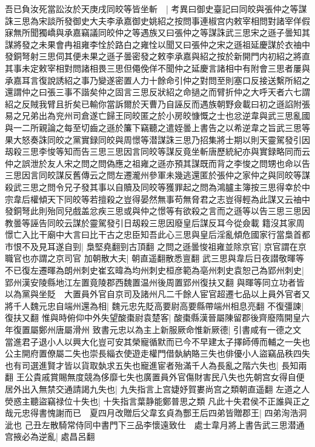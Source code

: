 吾已負汝死當訟汝於天庚戌同皎等皆坐斬　|{
	考異曰御史臺記曰同皎與張仲之等謀誅三思為宋談所發御史大夫李承嘉御史姚紹之按問事連椒宫内敕宰相問對諸宰佯假寐無所聞獨嶠與承嘉竊議同皎仲之等遇族又曰張仲之等謀誅武三思宋之遜子曇知其謀將發之未果會冉祖雍李恮於路白之雍恮以聞又曰張仲之宋之遜祖延慶謀於衣䄂中發銅弩射三思伺其便未果之遜子曇密發之敕李承嘉與紹之按於新開門内初紹之將直其事未定敕宰相對問諸相畏三思但僶俛佯不聞仲之延慶言諸相中有附會三思者屢與承嘉耳言復說誘紹之事乃變遂密置人力十餘命引仲之對問至則塞口反接送繫所紹之還謂仲之曰張三事不諧矣仲之固言三思反狀紹之命撾之而臂折仲之大呼天者六七謂紹之反賊我臂且折矣已輸你當訴爾於天曹乃自誣反而遇族朝野僉載曰初之遜諂附張易之兄弟出為兖州司倉遂亡歸王同皎匿之於小房皎慷慨之士也忿逆韋與武三思亂國與一二所親論之每至切齒之遜於簾下竊聽之遣姪曇上書告之以希逆韋之旨武三思等果大怒奏誅同皎之黨實録同皎與周憬等潜謀誅三思乃招集將士期以則天靈駕發引因刼殺三思李悛等知而告三思三思因言同皎等謀反竟坐斬唐歷統紀亦與實録略同而云仲之誤泄於友人宋之問之問偽應之祖雍之遜亦預其謀既而背之李悛之問甥也命以告三思因言同皎謀反舊傳云之問左遷瀧州參軍未幾逃還匿於張仲之家仲之與同皎等謀殺武三思之問令兄子發其事以自贖及同皎等獲罪起之問為鴻臚主簿按三思得幸於中宗韋后權傾天下同皎等若擅殺之豈得晏然無事苟無脅君之志豈得輕為此謀又云䄂中發銅弩此則殆同兒戲盖忿疾三思或與仲之憬等有欲殺之言而之遜等以告三思三思因教曇等誣告同皎云謀於靈駕發引日刼殺三思因廢皇后謀反耳今從僉載}
籍沒其家周憬亡入比干廟中大言曰比干古之忠臣知吾此心三思與皇后淫亂傾危國家行當梟首都市恨不及見耳遂自剄|{
	梟堅堯翻剄古頂翻}
之問之遜曇悛祖雍並除京官|{
	京官謂在京職官也亦謂之京司官}
加朝散大夫|{
	朝直遥翻散悉亶翻}
武三思與韋后日夜譛敬暉等不已復左遷暉為朗州刺史崔玄暐為均州刺史桓彦範為亳州刺史袁恕己為郢州刺史|{
	郢州漢安陵縣地江左置竟陵郡西魏置温州後周置郢州復扶又翻}
與暉等同立功者皆以為黨與坐貶　大置員外官自京司及諸州凡二千餘人宦官超遷七品以上員外官者又將千人魏元忠自端州還為相|{
	魏元忠先貶高要尉高要縣帶端州相息亮翻}
不復彊諫|{
	復扶又翻}
惟與時俯仰中外失望酸棗尉袁楚客|{
	酸棗縣漢晉屬陳留郡後齊廢隋開皇六年復置屬鄭州唐屬滑州}
致書元忠以為主上新服厥命惟新厥德|{
	引書咸有一德之文}
當進君子退小人以興大化豈可安其榮寵循默而已今不早建太子擇師傅而輔之一失也公主開府置僚屬二失也崇長緇衣使遊走權門借埶納賂三失也俳優小人盜竊品秩四失也有司選進賢才皆以貨取埶求五失也寵進宦者殆滿千人為長亂之階六失也|{
	長知兩翻}
王公貴戚賞賜無度競為侈靡七失也廣置員外官傷財害民八失也先朝宫女得自便居外出入無禁交通請謁九失也|{
	九失指言上宫婕妤賀婁尚宫之類朝直遥翻}
左道之人熒惑主聽盜竊禄位十失也|{
	十失指言葉静能鄭普思之類}
凡此十失君侯不正誰與正之哉元忠得書愧謝而已　夏四月改贈后父韋玄貞為酆王后四弟皆贈郡王|{
	四弟洵浩洞泚也}
己丑左散騎常侍同中書門下三品李懷遠致仕　處士韋月將上書告武三思潜通宫掖必為逆亂|{
	處昌呂翻}
